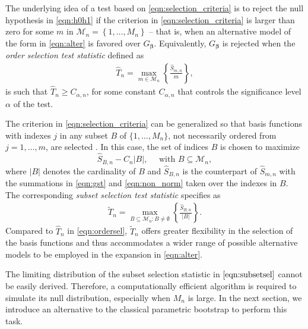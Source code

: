 \documentclass[11pt]{article}
\newcommand{\vect}[1]{\boldsymbol{#1}}
\begin{document}
The underlying idea of a test based on \eqref{eqn:selection_criteria} is to reject the null hypothesis in \eqref{eqn:h0h1} if the criterion in \eqref{eqn:selection_criteria} is larger than zero for some $m$ in $\mathcal{M}_n = \left\{1, \ldots, M_n\right\}$ -- that is, when an alternative model of the form in \eqref{eqn:alter} is favored over $G_{\vect{\beta}}$. 
Equivalently, $G_{\vect{\beta}}$ is rejected when  the \textit{order selection test statistic} defined as
\begin{equation}
\begin{aligned}
\widehat{T}_n=\max _{m \in \mathcal{M}_n}\left\{\frac{\widehat{S}_{m,n}}{m}  \right\},
\label{eqn:ordersel}
\end{aligned}
\end{equation}
is such that $\widehat{T}_n \geq C_{\alpha,n}$, for some constant $C_{\alpha,n}$ that controls the significance level $\alpha$ of the test. 

The criterion in \eqref{eqn:selection_criteria} can be generalized so that basis functions with indexes $j$ in any subset $B$ of $\{1,\dots, M_n\}$, not necessarily ordered from $j = 1, \dots, m$, are selected \citep[][pp.103-107]{thas2010}. In this case, the set of indices $B$ is chosen to maximize
\begin{equation}
\widehat{S}_{B,n} - C_n |B|, \quad \text{ with } B \subseteq \mathcal{M}_n, 
\label{eqn:selection_criteria_subset}
\end{equation}
where $|B|$ denotes the cardinality of $B$ and $\widehat{S}_{B,n}$ is the counterpart of $\widehat{S}_{m,n}$ with the summations in \eqref{eqn:gst} and \eqref{eqn:non_norm} taken over the indexes in $B$. 
The corresponding \textit{subset selection test statistic}  specifies as 
\begin{equation}
\begin{aligned}
    \widetilde{T}_{n} = \max_{ B\subseteq \mathcal{M}_n: B \neq \emptyset} \left\{\frac{\widehat{S}_{B, n}}{|B|} \right\}.
\label{eqn:subsetsel}
\end{aligned}
\end{equation}
Compared to $\widehat{T}_n$ in \eqref{eqn:ordersel}, $\widetilde{T}_n$ offers greater flexibility in the selection of the basis functions and thus accommodates a wider range of possible alternative models to be employed in the expansion in \eqref{eqn:alter}. 

The limiting distribution of the subset selection statistic in $\eqref{eqn:subsetsel}$ cannot be easily derived. Therefore, a computationally efficient algorithm is required to simulate its null distribution, especially when $M_n$ is large. In the next section, we introduce an alternative to the classical parametric bootstrap to perform this task. 
\end{document}
